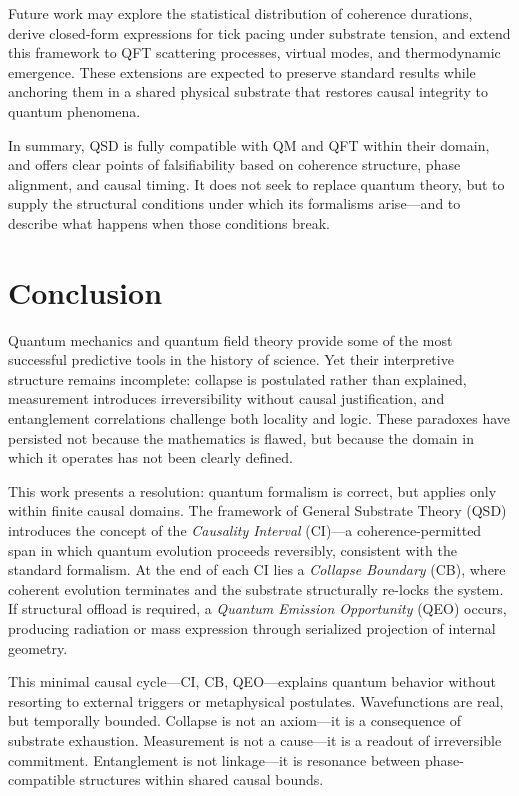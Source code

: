 \documentclass[entropy,article,submit,pdftex,moreauthors]{Definitions/mdpi}
\begin{document}
Future work may explore the statistical distribution of coherence durations, derive closed-form expressions for tick pacing under substrate tension, and extend this framework to QFT scattering processes, virtual modes, and thermodynamic emergence. These extensions are expected to preserve standard results while anchoring them in a shared physical substrate that restores causal integrity to quantum phenomena.

\smallskip

In summary, QSD is fully compatible with QM and QFT within their domain, and offers clear points of falsifiability based on coherence structure, phase alignment, and causal timing. It does not seek to replace quantum theory, but to supply the structural conditions under which its formalisms arise—and to describe what happens when those conditions break.



\section{Conclusion}

Quantum mechanics and quantum field theory provide some of the most successful predictive tools in the history of science. Yet their interpretive structure remains incomplete: collapse is postulated rather than explained, measurement introduces irreversibility without causal justification, and entanglement correlations challenge both locality and logic. These paradoxes have persisted not because the mathematics is flawed, but because the domain in which it operates has not been clearly defined.

This work presents a resolution: quantum formalism is correct, but applies only within finite causal domains. The framework of General Substrate Theory (QSD) introduces the concept of the \textit{Causality Interval} (CI)—a coherence-permitted span in which quantum evolution proceeds reversibly, consistent with the standard formalism. At the end of each CI lies a \textit{Collapse Boundary} (CB), where coherent evolution terminates and the substrate structurally re-locks the system. If structural offload is required, a \textit{Quantum Emission Opportunity} (QEO) occurs, producing radiation or mass expression through serialized projection of internal geometry.

This minimal causal cycle—CI, CB, QEO—explains quantum behavior without resorting to external triggers or metaphysical postulates. Wavefunctions are real, but temporally bounded. Collapse is not an axiom—it is a consequence of substrate exhaustion. Measurement is not a cause—it is a readout of irreversible commitment. Entanglement is not linkage—it is resonance between phase-compatible structures within shared causal bounds.
\end{document}
